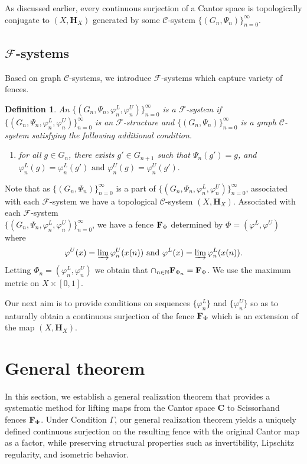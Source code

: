 \documentclass[11pt]{amsart}
\newtheorem{definition}[theorem]{Definition}
\newcommand{\N}{\mathbb{N}}  %
\newcommand{\cantor}{\mathbf C}
\newcommand{\fence}{{\bf F}_{\Phi}{}}
\newcommand{\nfence}{{\bf F}_{\Phi_n}{}}
\newcommand{\homeocantor}{{\mathbf H}_{X}}
\newcommand{\cC}{\mathcal{C}}
\newcommand{\cF}{\mathcal{F}}
\newcommand{\csystem}{\{(G_n,\Psi_n)\}_{n=0}^{\infty}}
\newcommand{\fsystem}{\{(G_n, \Psi_n,\varphi^L_n,\varphi^U_n)\}_{n=0}^{\infty}}
\begin{document}
{As discussed earlier, every continuous surjection of a Cantor space is topologically  conjugate to $(X,\homeocantor)$ generated by some $\cC$-system $\csystem$.



\subsection{${\cF}$-systems}\label{subsec:fsystmes}
Based on graph $\cC$-systems, we introduce $\cF$-systems which capture variety of fences. 

\begin{definition}\label{def:fsystem}
An $\fsystem$ is a \emph{$\cF$-system} if $\fsystem$ is an $\cF$-structure and $\csystem$ is a graph $\cC$-system satisfying the following additional condition.
\begin{enumerate}
    \item for all $ g \in G_n$, there exists  $ g' \in G_{n+1}$ such that $\Psi_n(g') = g$, and $\varphi^L_n(g) = \varphi^L_n(g') \text{ and } \varphi^U_n(g) = \varphi^U_n(g').$
\end{enumerate}
\end{definition}

Note that as $\csystem$ is a part of $\fsystem$, associated with each $\cF$-system  we have a topological $\cC$-system $(X,\homeocantor)$.
Associated with each $\cF$-system \\
$\fsystem$, we have a fence ${\bf F}_{\Phi{}}{}$ determined by $ \Phi = (\varphi ^L, \varphi ^U)$ where \[\varphi^U (x) = \varinjlim \varphi^U_n(x(n)) \text{ and } \varphi^L (x) = \varinjlim \varphi^L_n(x(n)).\]
 Letting $\Phi_n =(\varphi^L_n, \varphi^U_n)$
we obtain that $\cap_{n\in \N} \nfence=\fence$. We use the  maximum metric on $X\times [0,1]$.

Our next aim is to provide conditions on sequences $\{\varphi^L_n\}$ and $\{\varphi^U_n\}$ so as to naturally obtain a continuous surjection of the fence ${\bf F}_{\Phi{}}{}$ which is an extension of the map $(X,\homeocantor)$.



\section{General theorem}\label{sec:General theorem}

In this section, we establish a general realization theorem that provides a systematic method for lifting maps from the Cantor space $\cantor$ to Scissorhand fences $\fence$. %
Under Condition $\Gamma$, our general realization theorem yields a uniquely defined continuous surjection on the resulting fence with the original Cantor map as a factor, while preserving structural properties such as invertibility, Lipschitz regularity, and isometric behavior.

}
\end{document}
